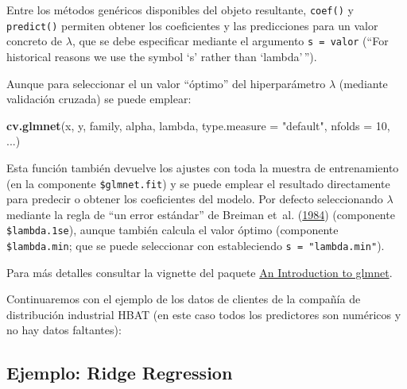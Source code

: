 \documentclass[
  spanish,
]{book}
\newenvironment{Shaded}{\begin{snugshade}}{\end{snugshade}}
\newcommand{\DataTypeTok}[1]{\textcolor[rgb]{0.13,0.29,0.53}{#1}}
\newcommand{\DecValTok}[1]{\textcolor[rgb]{0.00,0.00,0.81}{#1}}
\newcommand{\KeywordTok}[1]{\textcolor[rgb]{0.13,0.29,0.53}{\textbf{#1}}}
\newcommand{\NormalTok}[1]{#1}
\newcommand{\OperatorTok}[1]{\textcolor[rgb]{0.81,0.36,0.00}{\textbf{#1}}}
\newcommand{\StringTok}[1]{\textcolor[rgb]{0.31,0.60,0.02}{#1}}
\theoremstyle{break}
\theoremstyle{definition}
\theoremstyle{definition}
\theoremstyle{definition}
\theoremstyle{remark}
\begin{document}
Entre los métodos genéricos disponibles del objeto resultante, \texttt{coef()} y \texttt{predict()} permiten obtener los coeficientes y las predicciones para un valor concreto de \(\lambda\), que se debe especificar mediante el argumento \texttt{s\ =\ valor} (``For historical reasons we use the symbol `s' rather than `lambda'\,'').

Aunque para seleccionar el un valor ``óptimo'' del hiperparámetro \(\lambda\) (mediante validación cruzada) se puede emplear:

\begin{Shaded}
\begin{Highlighting}[]
\KeywordTok{cv.glmnet}\NormalTok{(x, y, family, alpha, lambda, }\DataTypeTok{type.measure =} \StringTok{"default"}\NormalTok{, }\DataTypeTok{nfolds =} \DecValTok{10}\NormalTok{, ...)}
\end{Highlighting}
\end{Shaded}

Esta función también devuelve los ajustes con toda la muestra de entrenamiento (en la componente \texttt{\$glmnet.fit}) y se puede emplear el resultado directamente para predecir o obtener los coeficientes del modelo.
Por defecto seleccionando \(\lambda\) mediante la regla de ``un error estándar'' de Breiman et~al. (\protect\hyperlink{ref-breiman1984classification}{1984}) (componente \texttt{\$lambda.1se}), aunque también calcula el valor óptimo (componente \texttt{\$lambda.min}; que se puede seleccionar con estableciendo \texttt{s\ =\ "lambda.min"}).

Para más detalles consultar la vignette del paquete \href{https://glmnet.stanford.edu/articles/glmnet.html}{An Introduction to glmnet}.

Continuaremos con el ejemplo de los datos de clientes de la compañía de distribución industrial HBAT (en este caso todos los predictores son numéricos y no hay datos faltantes):

\begin{Shaded}
\end{Shaded}

\hypertarget{ejemplo-ridge-regression}{%
\subsection{Ejemplo: Ridge Regression}\label{ejemplo-ridge-regression}}
\end{document}
